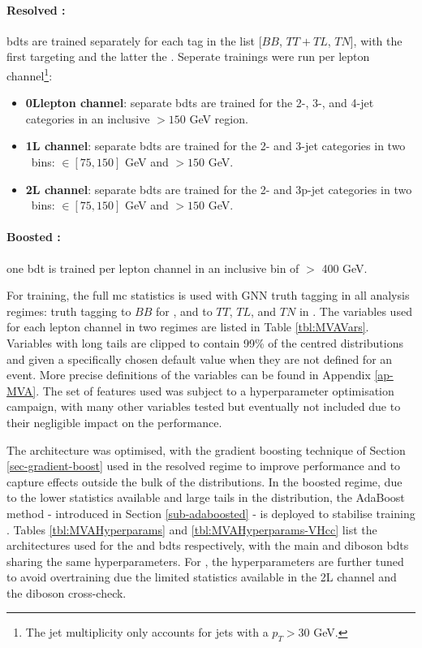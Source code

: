 \paragraph{Resolved \boldvhbc:} \gls{bdt}s are trained separately for each tag in the list [$BB$, $TT+TL$, $TN$], with the first targeting \vhb and the latter the \vhc. Seperate trainings were run per lepton channel\footnote{The jet multiplicity only accounts for jets with a $p_T > 30$ GeV.}:
\begin{itemize}
    \item \textbf{0Llepton channel}: separate \gls{bdt}s are trained for the 2-, 3-, and 4-jet categories in an inclusive \ptv $> 150$ GeV region.
    \item \textbf{1L channel}: separate \gls{bdt}s are trained for the 2- and 3-jet categories in two \ptv\ bins: \ptv $\in [75, 150]$ GeV and \ptv $> 150$ GeV.
    \item \textbf{2L channel}: separate \gls{bdt}s are trained for the 2- and 3p-jet categories in two \ptv\ bins: \ptv $\in [75, 150]$ GeV and \ptv $> 150$ GeV.
\end{itemize}
\paragraph{Boosted \vhb:} one \gls{bdt} is trained per lepton channel in an inclusive bin of \ptv $>$ 400 GeV.

For training, the full \gls{mc} statistics is used with GNN truth tagging in all analysis regimes: truth tagging to $BB$ for \vhb, and to $TT$, $TL$, and $TN$ in \vhc. The variables used for each lepton channel in two regimes are listed in Table \ref{tbl:MVAVars}. Variables with long tails are clipped to contain 99\% of the centred distributions and given a specifically chosen default value when they are not defined for an event. More precise definitions of the variables can be found in Appendix \ref{ap-MVA}. The set of features used was subject to a hyperparameter optimisation campaign, with many other variables tested but eventually not included due to their negligible impact on the performance. 



The architecture was optimised, with the gradient boosting technique of Section \ref{sec-gradient-boost} used in the resolved regime to improve performance and to capture effects outside the bulk of the distributions. In the boosted regime, due to the lower statistics available and large tails in the distribution, the AdaBoost method - introduced in Section \ref{sub-adaboosted} - is deployed to stabilise training \cite{Adaboost}. Tables \ref{tbl:MVAHyperparams} and \ref{tbl:MVAHyperparams-VHcc} list the architectures used for the \vhb and \vhc \gls{bdt}s respectively, with the main and diboson \gls{bdt}s sharing the same hyperparameters. For \vhc, the hyperparameters are further tuned to avoid overtraining due the limited statistics available in the 2L channel and the diboson cross-check.

